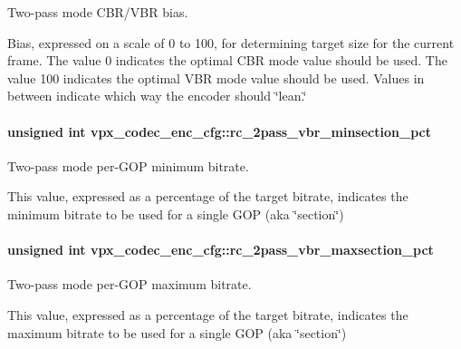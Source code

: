 Two-\/pass mode C\+B\+R/\+V\+BR bias. 

Bias, expressed on a scale of 0 to 100, for determining target size for the current frame. The value 0 indicates the optimal C\+BR mode value should be used. The value 100 indicates the optimal V\+BR mode value should be used. Values in between indicate which way the encoder should \char`\"{}lean.\char`\"{} 
\paragraph[{\texorpdfstring{rc\+\_\+2pass\+\_\+vbr\+\_\+minsection\+\_\+pct}{rc_2pass_vbr_minsection_pct}}]{\setlength{\rightskip}{0pt plus 5cm}unsigned int vpx\+\_\+codec\+\_\+enc\+\_\+cfg\+::rc\+\_\+2pass\+\_\+vbr\+\_\+minsection\+\_\+pct}\hypertarget{structvpx__codec__enc__cfg_a21eb9fce0844ae07b617bf3f0a25f5a5}{}\label{structvpx__codec__enc__cfg_a21eb9fce0844ae07b617bf3f0a25f5a5}


Two-\/pass mode per-\/\+G\+OP minimum bitrate. 

This value, expressed as a percentage of the target bitrate, indicates the minimum bitrate to be used for a single G\+OP (aka \char`\"{}section\char`\"{}) 
\paragraph[{\texorpdfstring{rc\+\_\+2pass\+\_\+vbr\+\_\+maxsection\+\_\+pct}{rc_2pass_vbr_maxsection_pct}}]{\setlength{\rightskip}{0pt plus 5cm}unsigned int vpx\+\_\+codec\+\_\+enc\+\_\+cfg\+::rc\+\_\+2pass\+\_\+vbr\+\_\+maxsection\+\_\+pct}\hypertarget{structvpx__codec__enc__cfg_ab5212050b71b2d9f4dc663caa496949e}{}\label{structvpx__codec__enc__cfg_ab5212050b71b2d9f4dc663caa496949e}


Two-\/pass mode per-\/\+G\+OP maximum bitrate. 

This value, expressed as a percentage of the target bitrate, indicates the maximum bitrate to be used for a single G\+OP (aka \char`\"{}section\char`\"{}) 
